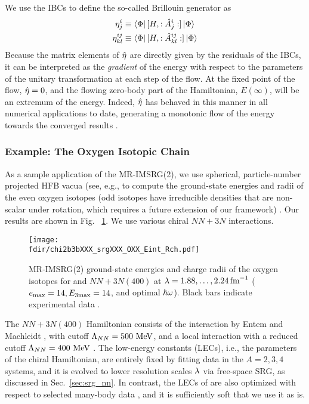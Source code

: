 We use the IBCs to define the so-called Brillouin generator as
\begin{align}
  \eta^{i}_{j}&\equiv\langle{\Phi}|\,{[{H},{:\hat{A}^{i}_{j}:}]}\,|{\Phi}\rangle\\
  \eta^{ij}_{kl}&\equiv\langle{\Phi}|\,{[{H},{:\hat{A}^{ij}_{kl}:}]}\,|{\Phi}\rangle
\end{align}
Because the matrix elements of $\hat{\eta}$ are directly given
by the residuals of the IBCs, it can be interpreted as the \emph{gradient}
of the energy with respect to the parameters of the unitary transformation 
at each step of the flow. At the fixed point of the flow, $\hat{\eta}=0$,
and the flowing zero-body part of the Hamiltonian, $E(\infty)$, will be an extremum 
of the energy. Indeed, $\hat{\eta}$ has behaved in this manner in all 
numerical applications to date, generating a monotonic flow of the  
energy towards the converged results \cite{Hergert:2017kx}.

%
%
\subsubsection{Example: The Oxygen Isotopic Chain}
As a sample application of the MR-IMSRG(2), we use spherical,
particle-number projected HFB vacua (see, e.g., \cite{Ring:1980bb,Hergert:2009zn}
to compute the ground-state energies and radii of the even oxygen 
isotopes (odd isotopes have irreducible densities that are non-scalar 
under rotation, which requires a future extension of our framework) 
\cite{Hergert:2013ij,Lapoux:2016xu}. Our results are shown in Fig.~
\ref{fig:OXX}. We use various chiral $NN+3N$ interactions.

\begin{figure}[t]
  \begin{center}
    \texttt{[image: \\fdir/chi2b3bXXX\_srgXXX\_OXX\_Eint\_Rch.pdf]}
  \end{center}
  \caption{\label{fig:OXX} MR-IMSRG(2) ground-state energies and charge radii of the oxygen 
    isotopes for \NNLOsat{} and $NN\!+\!3N(400)$ at $\lambda=1.88,\ldots,2.24\,\text{fm}^{-1}$ 
    ($e_{\text{max}}=14,E_{3\text{max}}=14$, and optimal $\hbar\omega$). Black bars indicate experimental 
    data \cite{Wang:2012uq,Angeli:2013rz}.
  }
\end{figure}

The $NN+3N(400)$ Hamiltonian consists of the \NNNLO{} interaction
by Entem and Machleidt \cite{Entem:2003th,Machleidt:2011bh}, with
cutoff $\Lambda_{NN}=500\,\,\text{MeV}$, and a local \NNLO{} interaction
with a reduced cutoff $\Lambda_{NN}=400\,\,\text{MeV}$ \cite{Roth:2011kx,Gazit:2009qf}.
The low-energy constants (LECs), i.e., the parameters of the chiral
Hamiltonian, are entirely fixed by fitting data in the $A=2,3,4$ systems, 
and it is evolved to lower resolution scales $\lambda$ via free-space 
SRG, as discussed in Sec.~\ref{sec:srg_nn}. In contrast, the LECs of \NNLOsat{} 
are also optimized with respect to selected many-body data \cite{Ekstrom:2015fk},
and it is sufficiently soft that we use it as is. 

